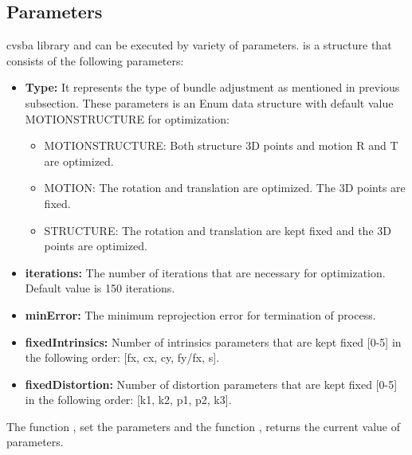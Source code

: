 \subsection{Parameters}
cvsba library and  can be executed by variety of parameters.  is a structure that consists of the following parameters:
\begin{itemize}
\item \textbf{Type:} It represents the type of bundle adjustment as mentioned in previous subsection. These parameters is an Enum data structure with default value MOTIONSTRUCTURE for optimization:
		\begin{itemize}
			\item MOTIONSTRUCTURE: Both structure {3D points} and motion {R and T} are optimized.
			\item MOTION: The rotation and translation are optimized. The 3D points are fixed.
			\item STRUCTURE: The rotation and translation are kept fixed and the 3D points are optimized.
		\end {itemize}
\item \textbf{iterations:} The number of iterations that are necessary for optimization. Default value is 150 iterations.
\item \textbf{minError:} The minimum reprojection error for termination of process.
\item \textbf{fixedIntrinsics:} Number of intrinsics parameters that are kept fixed [0-5] in the following order: [fx, cx, cy, fy/fx, s].
\item \textbf{fixedDistortion:} Number of distortion parameters that are kept fixed [0-5] in the following order: [k1, k2, p1, p2, k3].
\end{itemize}

The function , set the parameters and the function , returns the current value of parameters.

